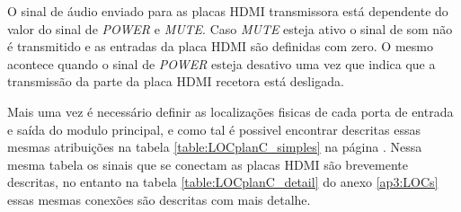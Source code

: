 O sinal de áudio enviado para as placas HDMI transmissora está dependente do valor do sinal de \textit{POWER} e \textit{MUTE}. Caso \textit{MUTE} esteja ativo o sinal de som não é transmitido e as entradas da placa HDMI são definidas com zero. O mesmo acontece quando o sinal de \textit{POWER} esteja desativo uma vez que indica que a transmissão da parte da placa HDMI recetora está desligada.

Mais uma vez é necessário definir as localizações fisicas de cada porta de entrada e saída do modulo principal, e como tal é possivel encontrar descritas essas mesmas atribuições na tabela \ref{table:LOCplanC_simples} na página \pageref{table:LOCplanC_simples}. Nessa mesma tabela os sinais que se conectam as placas HDMI são brevemente descritas, no entanto na tabela \ref{table:LOCplanC_detail} do anexo \ref{ap3:LOCs} essas mesmas conexões são descritas com mais detalhe.

